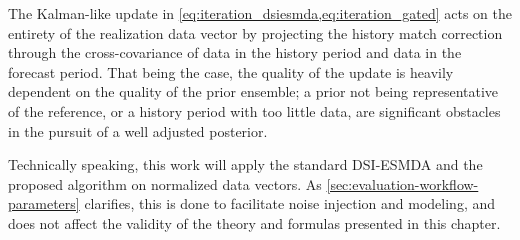 The Kalman-like update in \cref{eq:iteration_dsiesmda,eq:iteration_gated} 
acts on the entirety of the realization data vector by projecting the history match correction 
through the cross-covariance of data in the history period and data in the forecast period.
%
That being the case, the quality of the update is heavily dependent on the quality of the prior ensemble;
a prior not being representative of the reference, 
or a history period with too little data,
are significant obstacles in the pursuit of a well adjusted posterior.

\begin{note}
    Technically speaking, this work will apply the standard DSI-ESMDA and the proposed algorithm 
    on normalized data vectors.
    As \cref{sec:evaluation-workflow-parameters} clarifies, 
    this is done to facilitate noise injection and modeling,
    and does not affect the validity of the theory and formulas presented in this chapter.
\end{note}